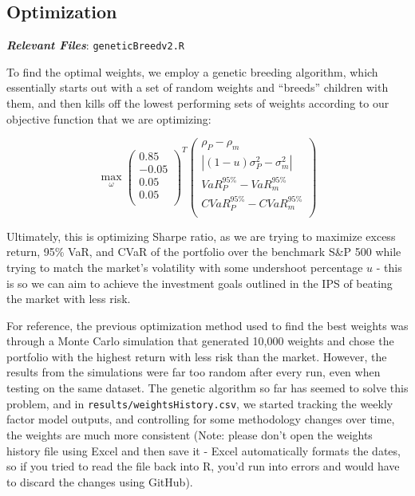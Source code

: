 \documentclass[]{article}
\begin{document}
\hypertarget{optimization}{%
\subsection{Optimization}\label{optimization}}

\textbf{\emph{Relevant Files}}: \texttt{geneticBreedv2.R}

To find the optimal weights, we employ a genetic breeding algorithm,
which essentially starts out with a set of random weights and ``breeds''
children with them, and then kills off the lowest performing sets of
weights according to our objective function that we are optimizing:

\[
\max\limits_{\omega}
\begin{pmatrix}
0.85 \\
-0.05 \\
0.05 \\
0.05 \\
\end{pmatrix}^T
\begin{pmatrix}
\rho_P - \rho_m \\
|(1-u)\sigma^2_P-\sigma^2_m| \\
VaR^{95\%}_P-VaR^{95\%}_m \\
CVaR^{95\%}_P-CVaR^{95\%}_m \\
\end{pmatrix}
\]

Ultimately, this is optimizing Sharpe ratio, as we are trying to
maximize excess return, 95\% VaR, and CVaR of the portfolio over the
benchmark S\&P 500 while trying to match the market's volatility with
some undershoot percentage \(u\) - this is so we can aim to achieve the
investment goals outlined in the IPS of beating the market with less
risk.

For reference, the previous optimization method used to find the best
weights was through a Monte Carlo simulation that generated 10,000
weights and chose the portfolio with the highest return with less risk
than the market. However, the results from the simulations were far too
random after every run, even when testing on the same dataset. The
genetic algorithm so far has seemed to solve this problem, and in
\texttt{results/weightsHistory.csv}, we started tracking the weekly
factor model outputs, and controlling for some methodology changes over
time, the weights are much more consistent (Note: please don't open the
weights history file using Excel and then save it - Excel automatically
formats the dates, so if you tried to read the file back into R, you'd
run into errors and would have to discard the changes using GitHub).
\end{document}
